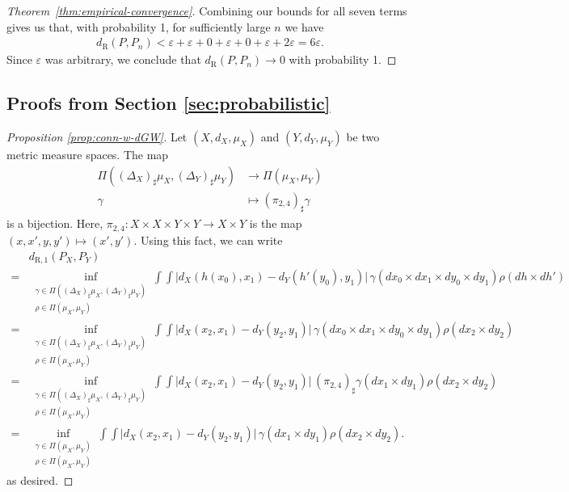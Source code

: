 \documentclass[twoside,11pt]{article}
\newcommand{\dexp}[1][]{d_{\mathrm{R}#1}}
\renewcommand{\epsilon}{\varepsilon}
\begin{document}
\begin{proof}[Theorem~\ref{thm:empirical-convergence}]
    Combining our bounds for all seven terms gives us that, with probability 1, for sufficiently large $n$ we have
    \begin{align*}
        \dexp(P,P_n) < \epsilon + \epsilon + 0 + \epsilon + 0 + \epsilon + 2\epsilon = 6\epsilon.
    \end{align*}
    Since $\epsilon$ was arbitrary, we conclude that $\dexp(P,P_n) \to 0$ with probability 1.
\end{proof}




\subsection{Proofs from Section \ref{sec:probabilistic}}
\begin{proof}[Proposition \ref{prop:conn-w-dGW}]
Let $(X,d_X,\mu_X)$ and $(Y,d_Y,\mu_Y)$ be two metric measure spaces. The map
\begin{align*}
    \Pi((\Delta_X)_\sharp\mu_X, (\Delta_Y)_\sharp \mu_Y) & \to \Pi(\mu_X, \mu_Y) \\
    \gamma & \mapsto (\pi_{2,4})_\sharp \gamma
\end{align*}
is a bijection. Here, $\pi_{2,4}:X\times X\times Y\times Y\to X\times Y$ is the map $(x,x',y,y')\mapsto (x',y')$. Using this fact, we can write
\begin{align*}
    &\dexp[,1](P_X,P_Y)
    \\= &
    \inf_{\substack{\gamma \in \Pi((\Delta_X)_\sharp\mu_X, (\Delta_Y)_\sharp \mu_Y)\\
    \rho \in  \Pi(\mu_X, \mu_Y)}}
    \int \int \big | d_X(h(x_0),x_1) - d_Y(h'(y_0),y_1) \big| \, \gamma(dx_0{\times}dx_1{\times}dy_0{\times}dy_1)\rho(dh{\times}dh')
    \\= &
    \inf_{\substack{\gamma \in \Pi((\Delta_X)_\sharp\mu_X, (\Delta_Y)_\sharp \mu_Y)\\
    \rho \in  \Pi(\mu_X, \mu_Y)}}
    \int \int \big | d_X(x_2,x_1) - d_Y(y_2,y_1) \big| \, \gamma(dx_0{\times}dx_1{\times}dy_0{\times}dy_1)\rho(dx_2{\times}dy_2)
    \\= &
    \inf_{\substack{\gamma \in \Pi((\Delta_X)_\sharp\mu_X, (\Delta_Y)_\sharp \mu_Y)\\
    \rho \in  \Pi(\mu_X, \mu_Y)}}
    \int \int \big | d_X(x_2,x_1) - d_Y(y_2,y_1) \big| \, (\pi_{2,4})_\sharp\gamma(dx_1{\times}dy_1)\rho(dx_2{\times}dy_2)
    \\= &
    \inf_{\substack{\gamma \in \Pi(\mu_X, \mu_Y)\\
    \rho \in  \Pi(\mu_X, \mu_Y)}}
    \int \int \big | d_X(x_2,x_1) - d_Y(y_2,y_1) \big| \, \gamma(dx_1{\times}dy_1)\rho(dx_2{\times}dy_2). 
\end{align*}
as desired.
\end{proof}
\end{document}
